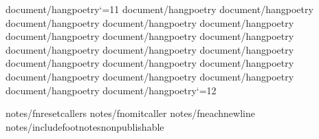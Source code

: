 {document/hangpoetry}\catcode`\@=11
{document/hangpoetry}
{document/hangpoetry}
{document/hangpoetry}
{document/hangpoetry}
{document/hangpoetry}
{document/hangpoetry}
{document/hangpoetry}
{document/hangpoetry}
{document/hangpoetry}
{document/hangpoetry}
{document/hangpoetry}
{document/hangpoetry}
{document/hangpoetry}
{document/hangpoetry}
{document/hangpoetry}
{document/hangpoetry}
{document/hangpoetry}
{document/hangpoetry}
{document/hangpoetry}\catcode`\@=12



{notes/fnresetcallers}
{notes/fnomitcaller}
{notes/fneachnewline}
{notes/includefootnotes}\expandafter\def\csname f:properties\endcsname{{nonpublishable}}

